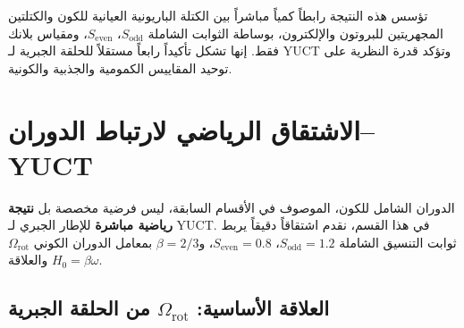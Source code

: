 \documentclass[12pt,a4paper]{article}
\newcommand{\Sodd}{S_{\mathrm{odd}}}
\newcommand{\Seven}{S_{\mathrm{even}}}
\begin{document}
	تؤسس هذه النتيجة رابطاً كمياً مباشراً بين الكتلة الباريونية العيانية للكون والكتلتين المجهريتين للبروتون والإلكترون، بوساطة الثوابت الشاملة \(\Sodd\)، \(\Seven\)، ومقياس بلانك فقط. إنها تشكل تأكيداً رابعاً مستقلاً للحلقة الجبرية لـ YUCT وتؤكد قدرة النظرية على توحيد المقاييس الكمومية والجذبية والكونية.
	
	\section{الاشتقاق الرياضي لارتباط الدوران–YUCT}
	\label{sec:rotation-yuct}
	
	الدوران الشامل للكون، الموصوف في الأقسام السابقة، ليس فرضية مخصصة بل \textbf{نتيجة رياضية مباشرة} للإطار الجبري لـ YUCT. في هذا القسم، نقدم اشتقاقاً دقيقاً يربط ثوابت التنسيق الشاملة \(S_{\mathrm{odd}}=1.2\)، \(S_{\mathrm{even}}=0.8\)، و\(\beta = 2/3\) بمعامل الدوران الكوني \(\Omega_{\mathrm{rot}}\) والعلاقة \(H_0 = \beta\omega\).
	
	\subsection{العلاقة الأساسية: \(\Omega_{\mathrm{rot}}\) من الحلقة الجبرية}
	
\end{document}

